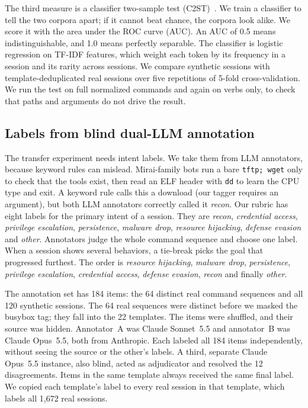 \documentclass[conference]{IEEEtran}
\newcommand{\lbl}[1]{\textit{#1}}
\newcommand{\cmd}[1]{\texttt{#1}}
\begin{document}
The third measure is a classifier two-sample test (C2ST)~\cite{lopezpaz2017c2st}. We train a classifier to tell the two corpora apart; if it cannot beat chance, the corpora look alike. We score it with the area under the ROC curve (AUC). An AUC of 0.5 means indistinguishable, and 1.0 means perfectly separable. The classifier is logistic regression on TF-IDF features, which weight each token by its frequency in a session and its rarity across sessions. We compare synthetic sessions with template-deduplicated real sessions over five repetitions of 5-fold cross-validation. We run the test on full normalized commands and again on verbs only, to check that paths and arguments do not drive the result.

\subsection{Labels from blind dual-LLM annotation}
The transfer experiment needs intent labels. We take them from LLM annotators, because keyword rules can mislead. Mirai-family bots run a bare \cmd{tftp; wget} only to check that the tools exist, then read an ELF header with \cmd{dd} to learn the CPU type and exit. A keyword rule calls this a download (our tagger requires an argument), but both LLM annotators correctly called it \lbl{recon}. Our rubric has eight labels for the primary intent of a session. They are \lbl{recon}, \lbl{credential access}, \lbl{privilege escalation}, \lbl{persistence}, \lbl{malware drop}, \lbl{resource hijacking}, \lbl{defense evasion} and \lbl{other}. Annotators judge the whole command sequence and choose one label. When a session shows several behaviors, a tie-break picks the goal that progressed furthest. The order is \lbl{resource hijacking}, \lbl{malware drop}, \lbl{persistence}, \lbl{privilege escalation}, \lbl{credential access}, \lbl{defense evasion}, \lbl{recon} and finally \lbl{other}.

The annotation set has 184 items: the 64 distinct real command sequences and all 120 synthetic sessions. The 64 real sequences were distinct before we masked the busybox tag; they fall into the 22 templates. The items were shuffled, and their source was hidden. Annotator~A was Claude Sonnet~5.5 and annotator~B was Claude Opus~5.5, both from Anthropic. Each labeled all 184 items independently, without seeing the source or the other's labels. A third, separate Claude Opus~5.5 instance, also blind, acted as adjudicator and resolved the 12 disagreements. Items in the same template always received the same final label. We copied each template's label to every real session in that template, which labels all 1,672 real sessions.
\end{document}
